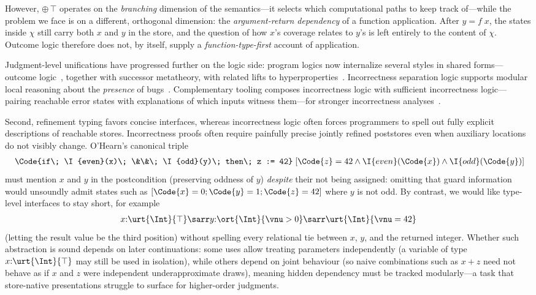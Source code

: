 However, $\oplus\,\top$ operates on the \emph{branching} dimension of
the semantics---it selects which computational paths to keep track
of---while the problem we face is on a different, orthogonal dimension:
the \emph{argument-return dependency} of a function application.
After $y = f\;x$, the states inside $\chi$ still carry both $x$ and
$y$ in the store, and the question of how $x$'s coverage relates to
$y$'s is left entirely to the content of $\chi$.
Outcome logic therefore does not, by itself, supply a
\emph{function-type-first} account of application.

Judgment-level unifications have progressed further on the logic side:
program logics now internalize several styles in shared forms---outcome logic~\cite{ZDS23}, together with successor metatheory,
with related lifts to hyperproperties~\cite{HyperHoareLogic}.
Incorrectness separation logic supports modular local reasoning about the \emph{presence} of bugs~\cite{RBD+20}.
Complementary tooling composes incorrectness logic with sufficient incorrectness logic---pairing reachable error states with explanations of which inputs witness them---for stronger incorrectness analyses~\cite{UTurn}.

Second, refinement typing favors concise interfaces, whereas incorrectness logic often forces programmers to spell out fully explicit descriptions of reachable stores.
Incorrectness proofs often require painfully precise jointly refined poststores even when auxiliary
locations do not visibly change.
O'Hearn's canonical triple~\cite{OHP19}
\begin{align*}
    [ \top ] \; \Code{if\; \I{even}(x)\; \&\&\; \I{odd}(y)\; then\; z := 42} \; [\Code{z} = 42 \land \I{even}(\Code{x}) \land \I{odd}(\Code{y})]
\end{align*}\noindent
must mention \(x\) and \(y\) in the postcondition (preserving oddness of \(y\)) \emph{despite} their
not being assigned: omitting that guard information would unsoundly admit states such as
\([\Code{x}=0;\Code{y}=1;\Code{z}=42]\) where \(y\) is not odd.
By contrast, we would like type-level interfaces to stay short, for example
\begin{align*}
    x{:}\urt{\Int}{\top} \sarr y{:}\ort{\Int}{\vnu > 0} \sarr \urt{\Int}{\vnu = 42}
\end{align*}\noindent
(letting the result value be the third position) without spelling every relational tie between
\(x\), \(y\), and the returned integer.
Whether such abstraction is sound depends on later continuations: some uses allow treating
parameters independently (a variable of type \(x{:}\urt{\Int}{\top}\) may still be used in isolation), while others
depend on joint behaviour (so naive combinations such as \(x+z\) need not behave as if \(x\) and \(z\) were independent underapproximate draws), meaning
hidden dependency must be tracked modularly---a task that store-native presentations struggle to surface
for higher-order judgments.

